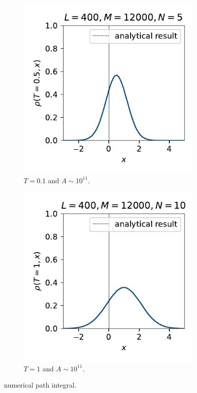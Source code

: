 \documentclass[10pt, a4paper]{article}
\numberwithin{equation}{section}
\begin{document}
\begin{itemize}
		\begin{figure}[H]
			\centering
			\begin{subfigure}{0.4\linewidth}
				\centering
				\includegraphics[scale=0.8]{figures/numerical path integral (normalized) of a free particle with initial state as a Gaussian wave packet and T=0.5 (L=400, M=12000, N=5).pdf}
				\caption{$T = 0.1$ and $A \sim 10^{11}$.}
			\end{subfigure}
			\begin{subfigure}{0.4\linewidth}
				\centering
				\includegraphics[scale=0.8]{figures/numerical path integral (normalized) of a free particle with initial state as a Gaussian wave packet and T=1 (L=400, M=12000, N=10).pdf}
				\caption{$T = 1$ and $A \sim 10^{11}$.}
			\end{subfigure}
			\caption{numerical path integral.}
		\end{figure}
	\end{itemize}
	
\end{document}
